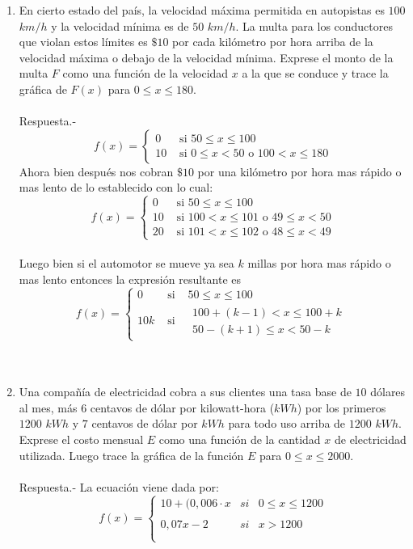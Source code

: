 \begin{enumerate}
    \item En cierto estado del país, la velocidad máxima permitida en autopistas es $100$ $km/h$ y la velocidad mínima es de $50$ $km/h$. La multa para los conductores que violan estos límites es $\$ 10$ por cada kilómetro por hora arriba de la velocidad máxima o debajo de la velocidad mínima. Exprese el monto de la multa $F$ como una función de la velocidad $x$ a la que se conduce y trace la gráfica de $F(x)$ para $0 \leq  x \leq 180$.\\\\
	Respuesta.-\; \[f(x)=\left\{\begin{matrix}0&\text{ si } 50\leq x\leq100\\10&\text{ si } 0\leq x < 50 \text{ o } 100< x\leq 180 \end{matrix}\right.\]
	 Ahora bien después nos cobran $\$ 10$ por una kilómetro por hora mas rápido o mas lento de lo establecido con lo cual:
\[f(x)=\left\{\begin{matrix}0&\text{ si } 50\leq x\leq 100\\10 &\text{ si } 100<x\leq101 \text{ o } 49\leq x<50\\ 20&\text{ si } 101<x\leq 102 \text{ o } 48\leq x < 49\end{matrix}\right.\] \\
	Luego bien si el automotor se mueve ya sea $k$ millas por hora mas rápido o mas lento entonces la expresión resultante es
	\[f(x)=\left\{\begin{matrix}0&\text{ si }& 50\leq x\leq100\\10k&\text{ si }&\begin{matrix}100+(k-1)<x\leq100+k\\50-(k+1)\leq x<50-k\end{matrix}\end{matrix}\right.\]\\\\
    
    \item  Una compañía de electricidad cobra a sus clientes una tasa base de $10$ dólares al mes, más $6$ centavos de dólar por kilowatt-hora ($kWh$) por los primeros $1200$ $kWh$ y $7$ centavos de dólar por $kWh$ para todo uso arriba de $1200$ $kWh$. Exprese el costo mensual $E$ como una función de la cantidad $x$ de electricidad utilizada. Luego trace la gráfica de la función $E$ para $0 \leq x \leq 2000.$\\\\
	Respuesta.-\; La ecuación viene dada por:
	\[f(x) = \left\{ \begin{array}{rcl} 
	    10 + (0,006\cdot x&si&0\leq x \leq 1200\\
	    \\ 0,07x - 2&si&x>1200\\\\
	\end{array}\right. \]


\end{enumerate}
